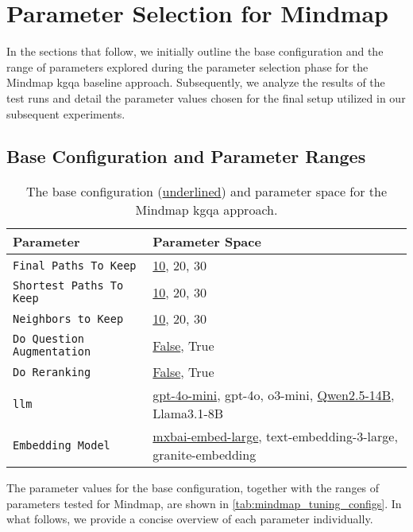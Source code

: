 

\section{Parameter Selection for Mindmap}
\label{sec:param_selection_mindmap}

In the sections that follow, we initially outline the base configuration and the range of parameters explored during the parameter selection phase for the Mindmap \gls{kgqa} baseline approach. Subsequently, we analyze the results of the test runs and detail the parameter values chosen for the final setup utilized in our subsequent experiments.

\subsection{Base Configuration and Parameter Ranges}

\begin{table}[t]
    \centering
    \begin{tabularx}{\textwidth}{l X}
        \toprule
        \textbf{Parameter} & \textbf{Parameter Space} \\
        \midrule
        \texttt{Final Paths To Keep} & \underline{10}, 20, 30 \\
        \texttt{Shortest Paths To Keep} & \underline{10}, 20, 30 \\
        \texttt{Neighbors to Keep} & \underline{10}, 20, 30 \\
        \texttt{Do Question Augmentation} & \underline{False}, True \\
        \texttt{Do Reranking} & \underline{False}, True \\
        \texttt{\gls{llm}} & \underline{gpt-4o-mini}, gpt-4o, o3-mini, \underline{Qwen2.5-14B}, Llama3.1-8B \\
        \texttt{Embedding Model} & \underline{mxbai-embed-large}, text-embedding-3-large, \newline granite-embedding \\
        \bottomrule
    \end{tabularx}
    \caption[Base Configuration and Parameter Space for Mindmap]{The base configuration (\underline{underlined}) and parameter space for the Mindmap \gls{kgqa} approach.}
    \label{tab:mindmap_tuning_configs}
\end{table}

The parameter values for the base configuration, together with the ranges of parameters tested for Mindmap, are shown in \autoref{tab:mindmap_tuning_configs}. In what follows, we provide a concise overview of each parameter individually.

